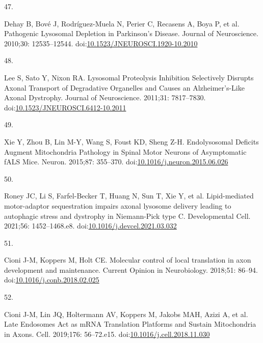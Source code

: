 \documentclass[
  12pt,
  a4paper,
]{book}
\newlength{\cslhangindent}
\newlength{\csllabelwidth}
\newlength{\cslentryspacingunit} %
\newenvironment{CSLReferences}[2] %
 {%
  \setlength{\parindent}{0pt}
  \ifodd #1
  \let\oldpar\par
  \def\par{\hangindent=\cslhangindent\oldpar}
  \fi
  \setlength{\parskip}{#2\cslentryspacingunit}
 }%
 {}
\newcommand{\CSLLeftMargin}[1]{\parbox[t]{\csllabelwidth}{#1}}
\newcommand{\CSLRightInline}[1]{\parbox[t]{\linewidth - \csllabelwidth}{#1}\break}
\begin{document}
\begin{CSLReferences}{0}{0}
\leavevmode{}%
\CSLLeftMargin{47. }%
\CSLRightInline{Dehay B, Bové J, Rodríguez-Muela N, Perier C, Recasens A, Boya P, et al. Pathogenic {Lysosomal Depletion} in {Parkinson}'s {Disease}. Journal of Neuroscience. 2010;30: 12535--12544. doi:\href{https://doi.org/10.1523/JNEUROSCI.1920-10.2010}{10.1523/JNEUROSCI.1920-10.2010}}

\leavevmode{}%
\CSLLeftMargin{48. }%
\CSLRightInline{Lee S, Sato Y, Nixon RA. Lysosomal {Proteolysis Inhibition Selectively Disrupts Axonal Transport} of {Degradative Organelles} and {Causes} an {Alzheimer}'s-{Like Axonal Dystrophy}. Journal of Neuroscience. 2011;31: 7817--7830. doi:\href{https://doi.org/10.1523/JNEUROSCI.6412-10.2011}{10.1523/JNEUROSCI.6412-10.2011}}

\leavevmode{}%
\CSLLeftMargin{49. }%
\CSLRightInline{Xie Y, Zhou B, Lin M-Y, Wang S, Foust KD, Sheng Z-H. Endolysosomal {Deficits Augment Mitochondria Pathology} in {Spinal Motor Neurons} of {Asymptomatic fALS Mice}. Neuron. 2015;87: 355--370. doi:\href{https://doi.org/10.1016/j.neuron.2015.06.026}{10.1016/j.neuron.2015.06.026}}

\leavevmode{}%
\CSLLeftMargin{50. }%
\CSLRightInline{Roney JC, Li S, Farfel-Becker T, Huang N, Sun T, Xie Y, et al. Lipid-mediated motor-adaptor sequestration impairs axonal lysosome delivery leading to autophagic stress and dystrophy in {Niemann-Pick} type {C}. Developmental Cell. 2021;56: 1452--1468.e8. doi:\href{https://doi.org/10.1016/j.devcel.2021.03.032}{10.1016/j.devcel.2021.03.032}}

\leavevmode{}%
\CSLLeftMargin{51. }%
\CSLRightInline{Cioni J-M, Koppers M, Holt CE. Molecular control of local translation in axon development and maintenance. Current Opinion in Neurobiology. 2018;51: 86--94. doi:\href{https://doi.org/10.1016/j.conb.2018.02.025}{10.1016/j.conb.2018.02.025}}

\leavevmode{}%
\CSLLeftMargin{52. }%
\CSLRightInline{Cioni J-M, Lin JQ, Holtermann AV, Koppers M, Jakobs MAH, Azizi A, et al. Late {Endosomes Act} as {mRNA Translation Platforms} and {Sustain Mitochondria} in {Axons}. Cell. 2019;176: 56--72.e15. doi:\href{https://doi.org/10.1016/j.cell.2018.11.030}{10.1016/j.cell.2018.11.030}}


\end{CSLReferences}
\end{document}
